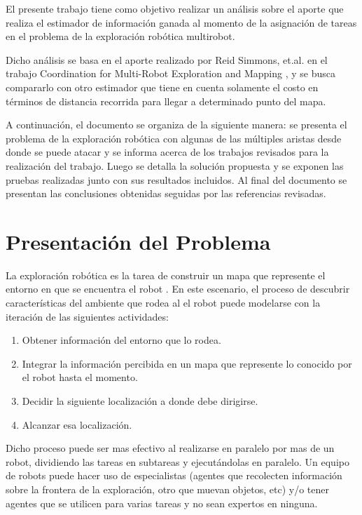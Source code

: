 \documentclass[runningheads]{llncs}
\begin{document}
El presente trabajo tiene como objetivo realizar un análisis sobre el aporte que realiza el estimador de información ganada al momento de la asignación de tareas en el problema de la exploración robótica multirobot.

Dicho análisis se basa en el aporte realizado por Reid Simmons, et.al. en el trabajo Coordination for Multi-Robot Exploration and Mapping \cite{artRef}, y se busca compararlo con otro estimador que tiene en cuenta solamente el costo en términos de distancia recorrida para llegar a determinado punto del mapa. 

A continuación, el documento se organiza de la siguiente manera: se presenta el problema de la exploración robótica con algunas de las múltiples aristas desde donde se puede atacar y se informa acerca de los trabajos revisados para la realización del trabajo. Luego se detalla la solución propuesta y se exponen las pruebas realizadas junto con sus resultados incluidos. Al final del documento se presentan las conclusiones obtenidas seguidas por las referencias revisadas.

\section{Presentación del Problema}

La exploración robótica es la tarea de construir un mapa que represente el entorno en que se encuentra el robot \cite{onSwitch}. En este escenario, el proceso de descubrir características del ambiente que rodea al el robot puede modelarse con la iteración de las siguientes actividades:
\begin{enumerate}
	\item Obtener información del entorno que lo rodea.
	\item Integrar la información percibida en un mapa que represente lo conocido por el robot hasta el momento.
	\item Decidir la siguiente localización a donde debe dirigirse.
	\item Alcanzar esa localización.
\end{enumerate}

Dicho proceso puede ser mas efectivo al realizarse en paralelo por mas de un robot, dividiendo las tareas en subtareas y ejecutándolas en paralelo. Un equipo de robots puede hacer uso de especialistas (agentes que recolecten información sobre la frontera de la exploración, otro que muevan objetos, etc) y/o tener agentes que se utilicen para varias tareas y no sean expertos en ninguna\cite{war}.
\end{document}
